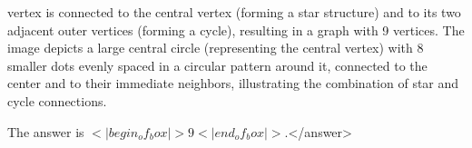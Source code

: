 vertex is connected to the central vertex (forming a star structure) and to its two adjacent outer vertices (forming a cycle), resulting in a graph with 9 vertices. The image depicts a large central circle (representing the central vertex) with 8 smaller dots evenly spaced in a circular pattern around it, connected to the center and to their immediate neighbors, illustrating the combination of star and cycle connections.  

The answer is \(<|begin_of_box|>9<|end_of_box|>\).</answer>